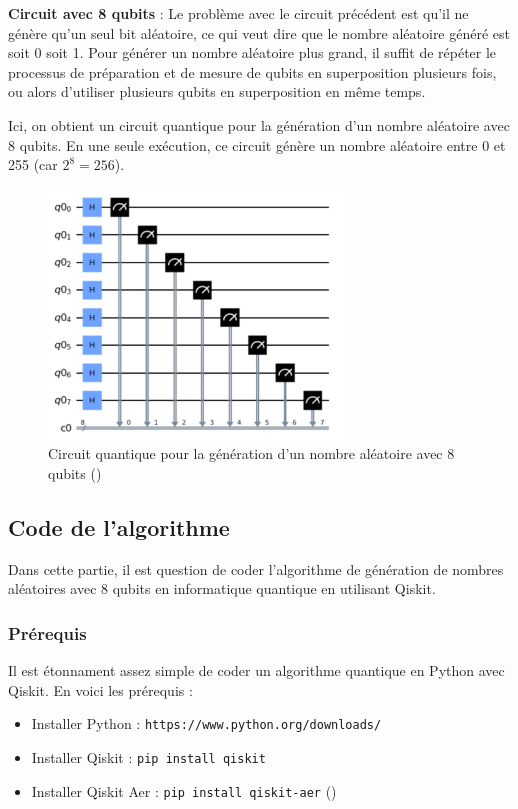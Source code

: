\documentclass{article}
\begin{document}
\textbf{Circuit avec 8 qubits} :
Le problème avec le circuit précédent est qu'il ne génère qu'un seul bit aléatoire, ce qui veut dire que le nombre aléatoire généré est soit 0 soit 1. 
Pour générer un nombre aléatoire plus grand, il suffit de répéter le processus de préparation et de mesure de qubits en superposition plusieurs fois,
ou alors d'utiliser plusieurs qubits en superposition en même temps.

Ici, on obtient un circuit quantique pour la génération d'un nombre aléatoire avec 8 qubits.
En une seule exécution, ce circuit génère un nombre aléatoire entre 0 et 255 (car $2^8 = 256$).

\begin{figure}[H]
  \centering
  \includegraphics[width=0.7\textwidth]{img/portesLogiquesRandom8.png}
  \caption{Circuit quantique pour la génération d'un nombre aléatoire avec 8 qubits (\cite{sapTrueRandomness})}
\end{figure}

\subsection{Code de l'algorithme}

Dans cette partie, il est question de coder l'algorithme de génération de nombres aléatoires avec 8 qubits en informatique quantique en utilisant Qiskit.

\subsubsection{Prérequis}
Il est étonnament assez simple de coder un algorithme quantique en Python avec Qiskit. En voici les prérequis :

\begin{itemize}
  \item Installer Python : \texttt{https://www.python.org/downloads/}
  \item Installer Qiskit : \texttt{pip install qiskit}
  \item Installer Qiskit Aer : \texttt{pip install qiskit-aer} (\cite{qiskitGettingStarted})
\end{itemize}
\end{document}
